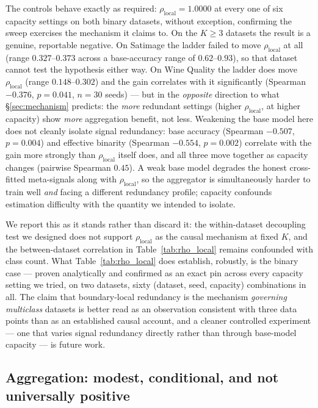 \documentclass[conference]{IEEEtran}
\begin{document}
The controls behave exactly as required: $\rho_{\mathrm{local}} = 1.0000$
at every one of six capacity settings on both binary datasets, without
exception, confirming the sweep exercises the mechanism it claims to.
On the $K \ge 3$ datasets the result is a genuine, reportable negative.
On Satimage the ladder failed to move $\rho_{\mathrm{local}}$ at all
(range $0.327$--$0.373$ across a base-accuracy range of $0.62$--$0.93$),
so that dataset cannot test the hypothesis either way. On Wine Quality
the ladder does move $\rho_{\mathrm{local}}$ (range $0.148$--$0.302$) and
the gain correlates with it significantly (Spearman $-0.376$,
$p = 0.041$, $n=30$ seeds) --- but in the \emph{opposite} direction to
what \S\ref{sec:mechanism} predicts: the \emph{more} redundant settings
(higher $\rho_{\mathrm{local}}$, at higher capacity) show \emph{more}
aggregation benefit, not less. Weakening the base model here does not
cleanly isolate signal redundancy: base accuracy (Spearman $-0.507$,
$p = 0.004$) and effective binarity (Spearman $-0.554$, $p = 0.002$)
correlate with the gain more strongly than $\rho_{\mathrm{local}}$ itself
does, and all three move together as capacity changes (pairwise Spearman
$0.45$). A weak base model degrades the honest cross-fitted meta-signals
along with $\rho_{\mathrm{local}}$, so the aggregator is simultaneously
harder to train well \emph{and} facing a different redundancy profile;
capacity confounds estimation difficulty with the quantity we intended to
isolate.

We report this as it stands rather than discard it: the within-dataset
decoupling test we designed does not support $\rho_{\mathrm{local}}$ as
the causal mechanism at fixed $K$, and the between-dataset correlation in
Table~\ref{tab:rho_local} remains confounded with class count. What
Table~\ref{tab:rho_local} does establish, robustly, is the binary case ---
proven analytically and confirmed as an exact pin across every capacity
setting we tried, on two datasets, sixty (dataset, seed, capacity)
combinations in all. The claim that boundary-local redundancy is the
mechanism \emph{governing multiclass} datasets is better read as an
observation consistent with three data points than as an established
causal account, and a cleaner controlled experiment --- one that varies
signal redundancy directly rather than through base-model capacity --- is
future work.





\subsection{Aggregation: modest, conditional, and not universally positive}
\end{document}
